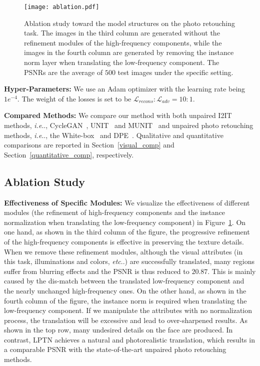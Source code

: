 \documentclass[10pt,twocolumn,letterpaper]{article}
\makeatletter
\DeclareRobustCommand\onedot{\futurelet\@let@token\@onedot}
\def\@onedot{\ifx\@let@token.\else.\null\fi\xspace}
\def\ie{\emph{i.e}\onedot} \def\Ie{\emph{I.e}\onedot}
\def\etc{\emph{etc}\onedot} \def\vs{\emph{vs}\onedot}
\makeatother
\begin{document}
	
	\begin{figure*}[t]
		\centering
		\texttt{[image: ablation.pdf]}
		\caption{Ablation study toward the model structures on the photo retouching task. The images in the third column are generated without the refinement modules of the high-frequency components, while the images in the fourth column are generated by removing the instance norm layer when translating the low-frequency component. The PSNRs are the average of $500$ test images under the specific setting.
			\label{ablation_model}}
	\end{figure*}
	
		
	\noindent\textbf{Hyper-Parameters:} We use an Adam optimizer with the learning rate being $1e^{-4}$. The weight of the losses is set to be $ \mathcal{L}_{recons} : \mathcal{L}_{adv}  = 10:1 $.
	
	\noindent\textbf{Compared Methods:} We compare our method with both unpaired I2IT methods, \ie, CycleGAN~\cite{zhu2017unpaired}, UNIT~\cite{liu2017unsupervised} and MUNIT~\cite{huang2018multimodal} and unpaired photo retouching methods, \ie, the White-box~\cite{hu2018exposure} and DPE~\cite{chen2018deep}. Qualitative and quantitative comparisons are reported in Section~\ref{visual_comp} and Section~\ref{quantitative_comp}, respectively.
	
	
	\subsection{Ablation Study}
	
	\noindent\textbf{Effectiveness of Specific Modules: } We visualize the effectiveness of different modules (the refinement of high-frequency components and the instance normalization when translating the low-frequency component) in Figure~\ref{ablation_model}. On one hand, as shown in the third column of the figure, the progressive refinement of the high-frequency components is effective in preserving the texture details. When we remove these refinement modules, although the visual attributes (in this task, illuminations and colors, \etc) are successfully translated, many regions suffer from blurring effects and the PSNR is thus reduced to $20.87$. This is mainly caused by the dis-match between the translated low-frequency component and the nearly unchanged high-frequency ones. On the other hand, as shown in the fourth column of the figure, the instance norm is required when translating the low-frequency component. If we manipulate the attributes with no normalization process, the translation will be excessive and lead to over-sharpened results. As shown in the top row, many undesired details on the face are produced. In contrast, LPTN achieves a natural and photorealistic translation, which results in a comparable PSNR with the state-of-the-art unpaired photo retouching methods.
	
\end{document}
